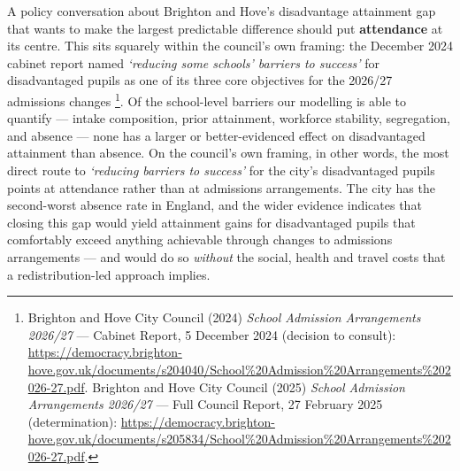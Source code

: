 \documentclass[
  12pt,
  titlepage]{article}
\begin{document}
A policy conversation about Brighton and Hove's disadvantage attainment
gap that wants to make the largest predictable difference should put
\textbf{attendance} at its centre. This sits squarely within the
council's own framing: the December 2024 cabinet report named
\emph{`reducing some schools' barriers to success'} for disadvantaged
pupils as one of its three core objectives for the 2026/27 admissions
changes \footnote{Brighton and Hove City Council (2024) \emph{School
  Admission Arrangements 2026/27} --- Cabinet Report, 5 December 2024
  (decision to consult):
  \url{https://democracy.brighton-hove.gov.uk/documents/s204040/School\%20Admission\%20Arrangements\%202026-27.pdf}.
  Brighton and Hove City Council (2025) \emph{School Admission
  Arrangements 2026/27} --- Full Council Report, 27 February 2025
  (determination):
  \url{https://democracy.brighton-hove.gov.uk/documents/s205834/School\%20Admission\%20Arrangements\%202026-27.pdf}.}.
Of the school-level barriers our modelling is able to quantify ---
intake composition, prior attainment, workforce stability, segregation,
and absence --- none has a larger or better-evidenced effect on
disadvantaged attainment than absence. On the council's own framing, in
other words, the most direct route to \emph{`reducing barriers to
success'} for the city's disadvantaged pupils points at attendance
rather than at admissions arrangements. The city has the second-worst
absence rate in England, and the wider evidence indicates that closing
this gap would yield attainment gains for disadvantaged pupils that
comfortably exceed anything achievable through changes to admissions
arrangements --- and would do so \emph{without} the social, health and
travel costs that a redistribution-led approach implies.
\end{document}
